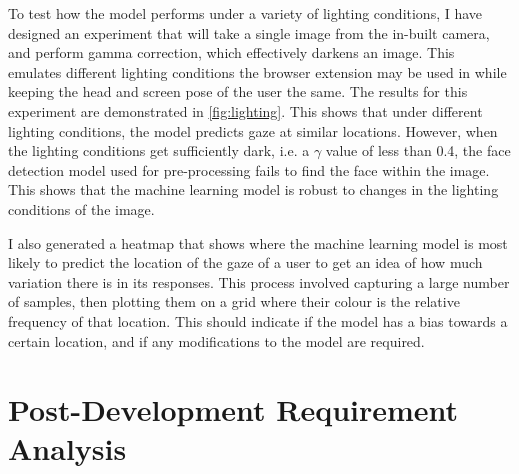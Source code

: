 \documentclass{report}
\begin{document}
To test how the model performs under a variety of lighting conditions, I have designed an experiment that will take a single image from the in-built camera, and perform gamma correction, which effectively darkens an image. This emulates different lighting conditions the browser extension may be used in while keeping the head and screen pose of the user the same. The results for this experiment are demonstrated in \autoref{fig:lighting}. This shows that under different lighting conditions, the model predicts gaze at similar locations. However, when the lighting conditions get sufficiently dark, i.e. a $\gamma$ value of less than 0.4, the face detection model used for pre-processing fails to find the face within the image. This shows that the machine learning model is robust to changes in the lighting conditions of the image. 

I also generated a heatmap that shows where the machine learning model is most likely to predict the location of the gaze of a user to get an idea of how much variation there is in its responses. This process involved capturing a large number of samples, then plotting them on a grid where their colour is the relative frequency of that location. This should indicate if the model has a bias towards a certain location, and if any modifications to the model are required. 





\section{Post-Development Requirement Analysis}
\label{sec:post-devel-requirement-analysis}
\end{document}
